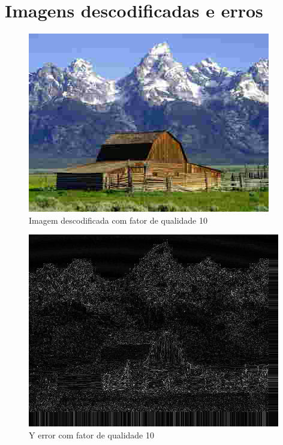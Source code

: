 \documentclass[a4paper, 12pt]{article}
\begin{document}
    \pagebreak
    \section{Imagens descodificadas e erros}
        \begin{multicols}{2}
            \begin{figure}[H]
                \includegraphics[width=\linewidth]{resources/DIFFS/Descodification_quality_10.png}
                \caption{\label{fig:my_label} Imagem descodificada com fator de qualidade 10}
            \end{figure}
            \begin{figure}[H]
                \includegraphics[width=\linewidth]{resources/DIFFS/Diff_Image_with_quality_10.png}
                \caption{\label{fig:my_label} Y error com fator de qualidade 10}
            \end{figure}
        \end{multicols}
\end{document}
